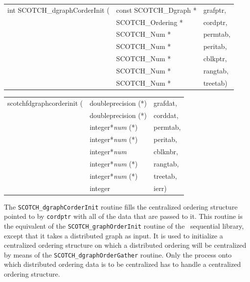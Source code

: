 \begin{itemize}
\progsyn

{\tt\begin{tabular}{l@{}ll}
int SCOTCH\_dgraphCorderInit ( & const SCOTCH\_Dgraph * & grafptr, \\
                               & SCOTCH\_Ordering *     & cordptr, \\
                               & SCOTCH\_Num *          & permtab, \\
                               & SCOTCH\_Num *          & peritab, \\
                               & SCOTCH\_Num *          & cblkptr, \\
                               & SCOTCH\_Num *          & rangtab, \\
                               & SCOTCH\_Num *          & treetab)
\end{tabular}}

{\tt\begin{tabular}{l@{}ll}
scotchfdgraphcorderinit ( & doubleprecision (*)   & grafdat, \\
                          & doubleprecision (*)   & corddat, \\
                          & integer*{\it num} (*) & permtab, \\
                          & integer*{\it num} (*) & peritab, \\
                          & integer*{\it num}     & cblknbr, \\
                          & integer*{\it num} (*) & rangtab, \\
                          & integer*{\it num} (*) & treetab, \\
                          & integer               & ierr)
\end{tabular}}

\progdes

The {\tt SCOTCH\_dgraph\lbt Corder\lbt Init} routine fills the
centralized ordering structure pointed to by {\tt cordptr} with all of
the data that are passed to it. This routine is the equivalent of the
{\tt SCOTCH\_\lbt graph\lbt Order\lbt Init} routine of the
\scotch\ sequential library, except that it takes a distributed graph
as input. It is used to initialize a centralized ordering structure on
which a distributed ordering will be centralized by means of the
{\tt SCOTCH\_\lbt dgraph\lbt Order\lbt Gather} routine. Only the
process onto which distributed ordering data is to be centralized has
to handle a centralized ordering structure.


\end{itemize}
